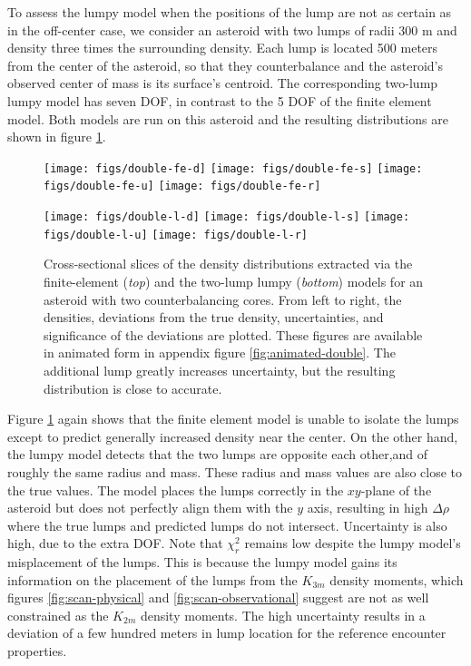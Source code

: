 \documentclass[fleqn,usenatbib]{mnras}
\begin{document}
To assess the lumpy model when the positions of the lump are not as certain as in the off-center case, we consider an asteroid with two lumps of radii 300 m and density three times the surrounding density. Each lump is located 500 meters from the center of the asteroid, so that they counterbalance and the asteroid's observed center of mass is its surface's centroid. The corresponding two-lump lumpy model has seven DOF, in contrast to the 5 DOF of the finite element model. Both models are run on this asteroid and the resulting distributions are shown in figure \ref{fig:den-double}.

\begin{figure}
  \texttt{[image: figs/double-fe-d]}\hfill
  \texttt{[image: figs/double-fe-s]}\hfill
  \texttt{[image: figs/double-fe-u]}\hfill
  \texttt{[image: figs/double-fe-r]}

  \texttt{[image: figs/double-l-d]}\hfill
  \texttt{[image: figs/double-l-s]}\hfill
  \texttt{[image: figs/double-l-u]}\hfill
  \texttt{[image: figs/double-l-r]}

  \caption{Cross-sectional slices of the density distributions extracted via the finite-element (\textit{top}) and the two-lump lumpy (\textit{bottom}) models for an asteroid with two counterbalancing cores. From left to right, the densities, deviations from the true density, uncertainties, and significance of the deviations are plotted. These figures are available in animated form in appendix figure \ref{fig:animated-double}. The additional lump greatly increases uncertainty, but the resulting distribution is close to accurate.}
  \label{fig:den-double}
\end{figure}

Figure \ref{fig:den-double} again shows that the finite element model is unable to isolate the lumps except to predict generally increased density near the center. On the other hand, the lumpy model detects that the two lumps are opposite each other,and of roughly the same radius and mass. These radius and mass values are also close to the true values. The model places the lumps correctly in the $xy$-plane of the asteroid but does not perfectly align them with the $y$ axis, resulting in high $\Delta \rho$ where the true lumps and predicted lumps do not intersect. Uncertainty is also high, due to the extra DOF. Note that $\chi^2_r$ remains low despite the lumpy model's misplacement of the lumps. This is because the lumpy model gains its information on the placement of the lumps from the $K_{3m}$ density moments, which figures \ref{fig:scan-physical} and \ref{fig:scan-observational} suggest are not as well constrained as the $K_{2m}$ density moments. The high uncertainty results in a deviation of a few hundred meters in lump location for the reference encounter properties.
\end{document}
